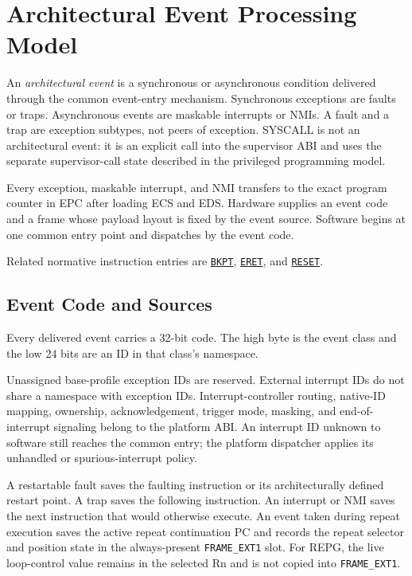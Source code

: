 \clearpage
\section{Architectural Event Processing Model}\label{page:architectural-event-processing-model}

An \emph{architectural event} is a synchronous or asynchronous condition delivered through the common event-entry
mechanism. Synchronous exceptions are faults or traps. Asynchronous events are maskable interrupts or NMIs. A fault
and a trap are exception subtypes, not peers of exception. SYSCALL is not an architectural event: it is an explicit
call into the supervisor ABI and uses the separate supervisor-call state described in the privileged programming
model.

Every exception, maskable interrupt, and NMI transfers to the exact program counter in EPC after loading ECS and EDS.
Hardware supplies an event code and a frame whose payload layout is fixed by the event source. Software begins at one
common entry point and dispatches by the event code.

Related normative instruction entries are
\hyperref[instr:bkpt]{\texttt{BKPT}},
\hyperref[instr:eret]{\texttt{ERET}}, and
\hyperref[instr:reset]{\texttt{RESET}}.\par

\subsection{Event Code and Sources}\label{section:event-code-and-sources}
Every delivered event carries a 32-bit code. The high byte is the event class and the low 24 bits are an ID in that
class's namespace.





Unassigned base-profile exception IDs are reserved. External interrupt IDs do not share a namespace with exception
IDs. Interrupt-controller routing,
native-ID mapping, ownership, acknowledgement, trigger mode, masking, and end-of-interrupt signaling belong to the
platform ABI. An interrupt ID unknown to software still reaches the common entry;
the platform dispatcher applies its unhandled or spurious-interrupt policy.

A restartable fault saves the faulting instruction or its architecturally defined restart point. A trap saves the
following instruction. An interrupt or NMI saves the next instruction that would otherwise execute. An event taken
during repeat execution saves the active repeat continuation PC and records the repeat selector and position state
in the always-present \texttt{FRAME\_EXT1} slot. For REPG, the live loop-control value remains in the selected Rn and
is not copied into \texttt{FRAME\_EXT1}.

